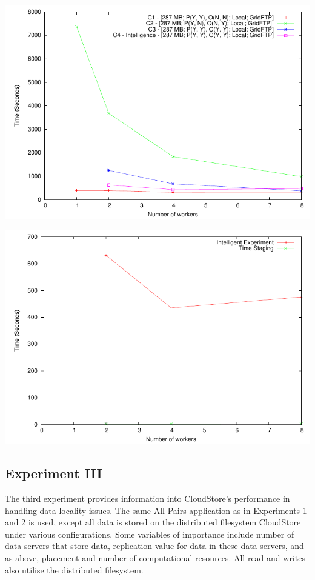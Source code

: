 \documentclass{rspublic}
\begin{document}
\includegraphics{data/graphs/IntelligentVsConventionalFigure}

\includegraphics{data/graphs/StagingAsAPortionOfIntelligenceFigure}

\subsection{Experiment III} The third experiment provides information
into CloudStore's performance in handling data locality issues.  The
same All-Pairs application as in Experiments 1 and 2 is used, except all
data is stored on the distributed filesystem CloudStore under various
configurations.  Some variables of importance include number of data
servers that store data, replication value for data in these data
servers, and as above, placement and number of computational resources.
All read and writes also utilise the distributed filesystem.  
\end{document}
